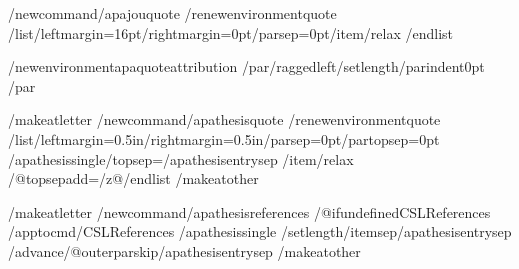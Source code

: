 /newcommand{/apajouquote}{%
  /renewenvironment{quote}
    {/list{}{/leftmargin=16pt/rightmargin=0pt/parsep=0pt}/item/relax}
    {/endlist}}

/newenvironment{apaquoteattribution}
  {/par/raggedleft/setlength{/parindent}{0pt}}
  {/par}

/makeatletter
/newcommand{/apathesisquote}{%
  /renewenvironment{quote}
    {/list{}{/leftmargin=0.5in/rightmargin=0.5in/parsep=0pt/partopsep=0pt
       /apathesissingle/topsep=/apathesisentrysep}%
     /item/relax}
    {/@topsepadd=/z@/endlist}}
/makeatother

/makeatletter
/newcommand{/apathesisreferences}{%
  /@ifundefined{CSLReferences}{}{%
    /apptocmd{/CSLReferences}%
      {/apathesissingle
       /setlength{/itemsep}{/apathesisentrysep}%
       /advance/@outerparskip/apathesisentrysep}{}{}}}
/makeatother

